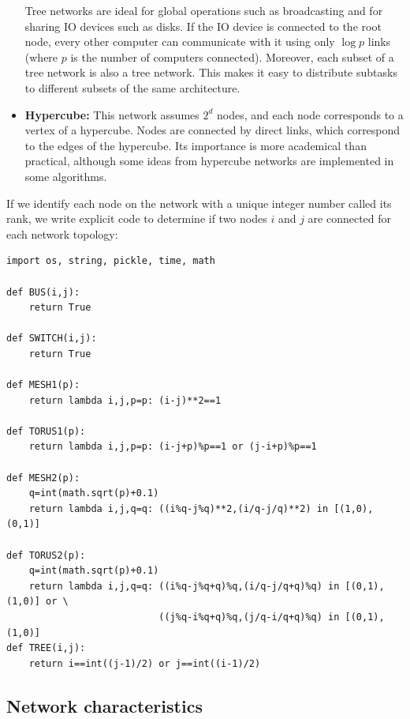 \documentclass[justified,sixbynine]{tufte-book}
\def\ft{\small\tt}
\theoremstyle{plain}%
\theoremstyle{definition}
\theoremstyle{remark}
\begin{document}
\begin{fullwidth}
\begin{itemize}
Tree networks are ideal for global operations such as broadcasting and for sharing IO devices such as disks. If the IO device is connected to the root node, every other computer can communicate with it using only $\log p$ links (where $p$ is the number of computers connected). Moreover, each subset of a tree network is also a tree network. This makes it easy to distribute subtasks to different subsets of the same architecture.

\item{\bf Hypercube:}
This network assumes $2^d$ nodes, and each node corresponds to a vertex of a hypercube. Nodes are connected by direct links, which correspond to the edges of the hypercube. Its importance is more academical than practical, although some ideas from hypercube networks are implemented in some algorithms.
\end{itemize}

If we identify each node on the network with a unique integer number called its rank, we write explicit code to determine if two nodes $i$ and $j$ are connected for each network topology:


\begin{lstlisting}[caption={in file: {\ft psim.py}}]
import os, string, pickle, time, math

def BUS(i,j):
    return True

def SWITCH(i,j):
    return True

def MESH1(p):
    return lambda i,j,p=p: (i-j)**2==1

def TORUS1(p):
    return lambda i,j,p=p: (i-j+p)%p==1 or (j-i+p)%p==1

def MESH2(p):
    q=int(math.sqrt(p)+0.1)
    return lambda i,j,q=q: ((i%q-j%q)**2,(i/q-j/q)**2) in [(1,0),(0,1)]

def TORUS2(p):
    q=int(math.sqrt(p)+0.1)
    return lambda i,j,q=q: ((i%q-j%q+q)%q,(i/q-j/q+q)%q) in [(0,1),(1,0)] or \
                           ((j%q-i%q+q)%q,(j/q-i/q+q)%q) in [(0,1),(1,0)]
def TREE(i,j):
    return i==int((j-1)/2) or j==int((i-1)/2)
\end{lstlisting}

\goodbreak\subsection{Network characteristics}



\end{fullwidth}
\end{document}
